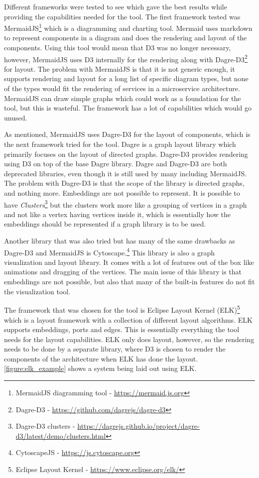 Different frameworks were tested to see which gave the best results while providing the capabilities needed for the tool.
The first framework tested was MermaidJS\footnote{MermaidJS diagramming tool - \url{https://mermaid.js.org}} which is a diagramming and charting tool. Mermaid uses markdown to represent components in a diagram and does the rendering and layout of the components. Using this tool would mean that D3 was no longer necessary, however, MermaidJS uses D3 internally for the rendering along with Dagre-D3\footnote{Dagre-D3 - \url{https://github.com/dagrejs/dagre-d3}} for layout.
The problem with MermaidJS is that it is not generic enough, it supports rendering and layout for a long list of specific diagram types, but none of the types would fit the rendering of services in a microservice architecture.
MermaidJS can draw simple graphs which could work as a foundation for the tool, but this is wasteful. The framework has a lot of capabilities which would go unused.

As mentioned, MermaidJS uses Dagre-D3 for the layout of components, which is the next framework tried for the tool.
Dagre is a graph layout library which primarily focuses on the layout of directed graphs. Dagre-D3 provides rendering using D3 on top of the base Dagre library.
Dagre and Dagre-D3 are both deprecated libraries, even though it is still used by many including MermaidJS.
The problem with Dagre-D3 is that the scope of the library is directed graphs, and nothing more.
Embeddings are not possible to represent.
It is possible to have \textit{Clusters}\footnote{Dagre-D3 clusters - \url{https://dagrejs.github.io/project/dagre-d3/latest/demo/clusters.html}}
but the clusters work more like a grouping of vertices in a graph and not like a vertex having vertices inside it, which is essentially how the embeddings should be represented if a graph library is to be used.

Another library that was also tried but has many of the same drawbacks as Dagre-D3 and MermaidJS is Cytoscape.\footnote{CytoscapeJS - \url{https://js.cytoscape.org}}
This library is also a graph visualization and layout library. It comes with a lot of features out of the box like animations and dragging of the vertices. The main issue of this library is that embeddings are
not possible, but also that many of the built-in features do not fit the visualization tool.

The framework that was chosen for the tool is Eclipse Layout Kernel (ELK)\footnote{Eclipse Layout Kernel - \url{https://www.eclipse.org/elk/}}
which is a layout framework with a collection of different layout algorithms. ELK supports embeddings, ports and edges. This is essentially everything the tool needs for the layout capabilities.
ELK only does layout, however, so the rendering needs to be done by a separate library, where D3 is chosen to render the components of the architecture when ELK has done the layout.
\cref{figure:elk_example} shows a system being laid out using ELK.

